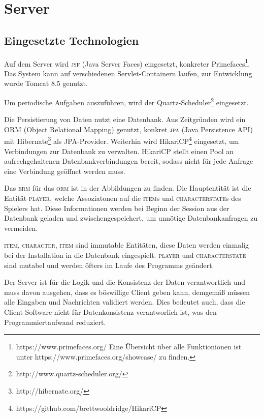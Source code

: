 \documentclass[ngerman,11pt]{report}
\begin{document}
\chapter{Server}

\section{Eingesetzte Technologien}

Auf dem Server wird \textsc{jsf} (Java Server Faces) eingesetzt, konkreter
Primefaces\footnote{https://www.primefaces.org/ Eine Übersicht über alle
Funktionionen ist unter https://www.primefaces.org/showcase/ zu finden.}.
Das System kann auf verschiedenen Servlet-Containern laufen, zur Entwicklung
wurde Tomcat 8.5 genutzt.

Um periodische Aufgaben auszuführen, wird der
Quartz-Scheduler\footnote{http://www.quartz-scheduler.org/} eingesetzt.

Die Persistierung von Daten nutzt eine Datenbank. Aus Zeitgründen wird ein ORM
(Object Relational Mapping) genutzt, konkret \textsc{jpa} (Java Persistence API)
mit Hibernate\footnote{http://hibernate.org/} als JPA-Provider. Weiterhin wird
HikariCP\footnote{https://github.com/brettwooldridge/HikariCP} eingesetzt, um
Verbindungen zur Datenbank zu verwalten. HikariCP stellt einen Pool an
aufrechgehaltenen Datenbankverbindungen bereit, sodass nicht für jede Anfrage
eine Verbindung geöffnet werden muss.

Das \textsc{erm} für das \textsc{orm} ist in der Abbildungen zu finden. Die Hauptentität
ist die Entität \textsc{player}, welche Assoziatonen auf die \textsc{item}s und
\textsc{characterstate}s des Spielers hat. Diese Informationen werden bei Beginn der
Session aus der Datenbank geladen und zwischengespeichert, um unnötige Datenbankanfragen
zu vermeiden.

\textsc{item}, \textsc{character}, \textsc{item} sind immutable Entitäten, diese Daten
werden einmalig bei der Installation in die Datenbank eingespielt. \textsc{player} und
\textsc{characterstate} sind mutabel und werden öfters im Laufe des Programms geändert.

Der Server ist für die Logik und die Konsistenz der Daten verantwortlich und muss davon
ausgehen, dass es böswillige Client geben kann, demgemäß müssen alle Eingaben und Nachrichten
validiert werden. Dies bedeutet auch, dass die Client-Software nicht für Datenkonsistenz
verantworlich ist, was den Programmiertaufwand reduziert.
\end{document}
